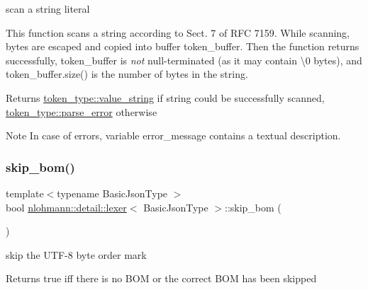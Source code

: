 scan a string literal 

This function scans a string according to Sect. 7 of R\+FC 7159. While scanning, bytes are escaped and copied into buffer token\+\_\+buffer. Then the function returns successfully, token\+\_\+buffer is {\itshape not} null-\/terminated (as it may contain \textbackslash{}0 bytes), and token\+\_\+buffer.\+size() is the number of bytes in the string.

\begin{DoxyReturn}{Returns}
\mbox{\hyperlink{classnlohmann_1_1detail_1_1lexer_a3f313cdbe187cababfc5e06f0b69b098a2b490e8bf366b4cbe3ebd99b26ce15ce}{token\+\_\+type\+::value\+\_\+string}} if string could be successfully scanned, \mbox{\hyperlink{classnlohmann_1_1detail_1_1lexer_a3f313cdbe187cababfc5e06f0b69b098a456e19aeafa334241c7ff3f589547f9d}{token\+\_\+type\+::parse\+\_\+error}} otherwise
\end{DoxyReturn}
\begin{DoxyNote}{Note}
In case of errors, variable error\+\_\+message contains a textual description. 
\end{DoxyNote}
\mbox{\label{classnlohmann_1_1detail_1_1lexer_a709afd52def2e258dac0b8a67dc4ea26}} 
\subsubsection{\texorpdfstring{skip\+\_\+bom()}{skip\_bom()}}
{\footnotesize\ttfamily template$<$typename Basic\+Json\+Type $>$ \\
bool \mbox{\hyperlink{classnlohmann_1_1detail_1_1lexer}{nlohmann\+::detail\+::lexer}}$<$ Basic\+Json\+Type $>$\+::skip\+\_\+bom (\begin{DoxyParamCaption}{ }\end{DoxyParamCaption})\hspace{0.3cm}{\ttfamily [inline]}}



skip the U\+T\+F-\/8 byte order mark 

\begin{DoxyReturn}{Returns}
true iff there is no B\+OM or the correct B\+OM has been skipped 
\end{DoxyReturn}
\mbox{\label{classnlohmann_1_1detail_1_1lexer_a626f145768762057dc68a4666eb577db}} 
